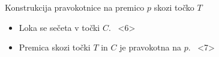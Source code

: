 \begin{frame}{Konstrukcija pravokotnice na premico $p$ skozi točko $T$}
\begin{itemize}[<+->]
			 \item Loka se sečeta v točki $C$. \ <6>
			 \item Premica skozi točki $T$ in $C$ je pravokotna na $p$. \ <7>
		  \end{itemize}

\end{frame}


				
				
